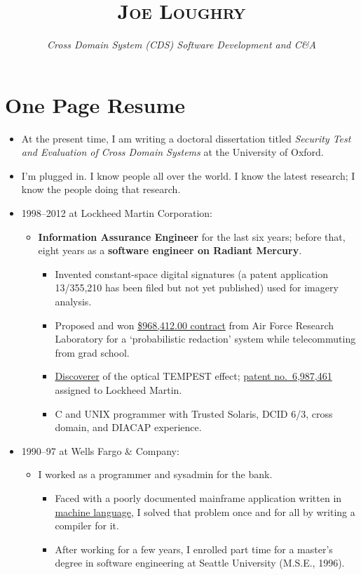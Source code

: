 \documentclass[12pt,letterpaper]{article}
\date{}
\title{\textsc{Joe Loughry}\vspace{-7mm}}
\author{\emph{Cross Domain System (CDS) Software Development and C\&A}}
\begin{document}
\maketitle
\thispagestyle{empty}

\vspace*{-20mm}
\section*{One Page Resume}

\begin{itemize}
	\item At the present time, I am writing a doctoral dissertation titled \emph{Security Test and
		Evaluation of Cross Domain Systems} at the University of Oxford.
	\item I'm plugged in.  I know people all over the world.  I know the latest research; I
		know the people doing that research.
	\item 1998--2012 at Lockheed Martin Corporation:
		\begin{itemize}
			\item \textbf{Information Assurance Engineer} for the last six years; before that,
				eight years as a \textbf{software engineer on Radiant Mercury}.
				\begin{itemize}
					\item Invented constant-space digital signatures (a patent application
						13/355,210 has been filed but not yet published) used for
						imagery analysis.
					\item Proposed and won
						\href{http://applied-math.org/Probabilistic_Redaction.pdf}{\$968,412.00
						contract} from Air Force Research Laboratory for a `probabilistic
						redaction' system while telecommuting from grad school.
					\item \href{http://applied-math.org/acm_optical_tempest.pdf}{Discoverer}
						of the optical TEMPEST effect;
						\href{http://www.google.com/patents/US6987461}{patent no.\ 6,987,461}
						assigned to Lockheed Martin.
					\item C and UNIX programmer with Trusted Solaris, DCID 6/3, cross domain,
						and DIACAP experience.
				\end{itemize}
		\end{itemize}

	\item 1990--97 at Wells Fargo \& Company:
		\begin{itemize}
			\item I worked as a programmer and sysadmin for the bank.
				\begin{itemize}
					\item Faced with a poorly documented mainframe application written in
						\href{https://github.com/jloughry/BANCStar/blob/master/README.md#code-sample}{machine language},
						I solved that problem once and for all by writing a compiler for it.
					\item After working for a few years, I enrolled part time for a master's
						degree in software engineering at Seattle University (M.S.E., 1996).
				\end{itemize}
		\end{itemize}


\end{itemize}
\end{document}

